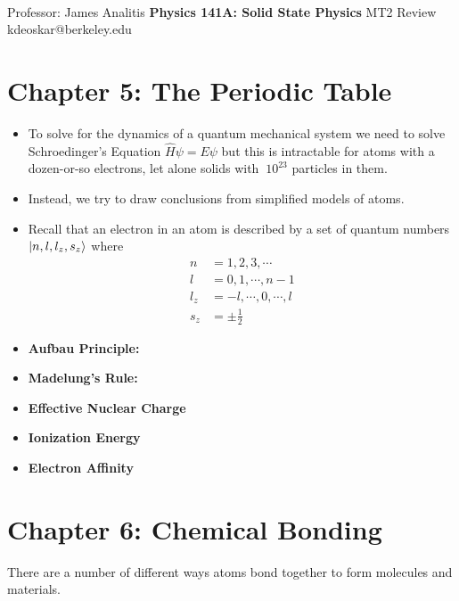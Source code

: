 \documentclass[11pt]{article}
\begin{document}
\thispagestyle{empty}
\bigskip \
\vspace{0.1cm}

\begin{center}
{\fontsize{22}{22} \selectfont Professor: James Analitis}
\vskip 16pt
{\fontsize{30}{30} \selectfont \bf \sffamily Physics 141A: Solid State Physics}
\vskip 24pt
{\fontsize{14}{14} \selectfont \rmfamily MT2 Review} 
\vskip 6pt
{\fontsize{14}{14} \selectfont \ttfamily kdeoskar@berkeley.edu} 
\vskip 24pt
\end{center}


\tableofcontents
\newpage

\section{Chapter 5: The Periodic Table}

\begin{itemize}
  \item To solve for the dynamics of a quantum mechanical system we need to solve Schroedinger's Equation $\hat{H}\psi = E \psi$ but this is intractable for atoms with a dozen-or-so electrons, let alone solids with $~10^{23}$ particles in them.
  \item Instead, we try to draw conclusions from simplified models of atoms.
  \item Recall that an electron in an atom is described by a set of quantum numbers $\lvert n, l, l_z, s_z\rangle$ where
  \begin{align*}
    n &= 1,2,3,\cdots \\
    l &= 0,1,\cdots,n-1 \\
    l_z &= -l,\cdots,0,\cdots,l \\
    s_z &= \pm \frac{1}{2}
  \end{align*}
  \item \textbf{Aufbau Principle:}
  \item \textbf{Madelung's Rule:}
  \item \textbf{Effective Nuclear Charge}
  \item \textbf{Ionization Energy}
  \item \textbf{Electron Affinity}
\end{itemize}

\newpage
\section{Chapter 6: Chemical Bonding}
There are a number of different ways atoms bond together to form molecules and materials.
\end{document}
